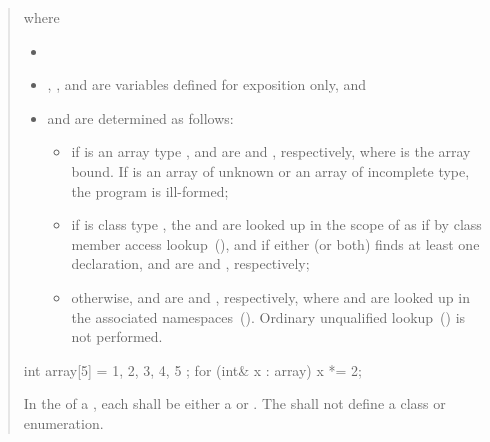 \begin{quote}
where

\begin{itemize}
\item
{}

\item
{}, , and  are variables defined for
exposition only, and 

\item
{} and  are determined as follows:

\begin{itemize}
\item if  is an 
array type ,  and  are
 and , respectively, where  is
the array bound. If  is an array of unknown  or an array of
incomplete type, the program is ill-formed;

\item if  is 
class type , the 
 and  are looked up in the scope of 
as if by class member access lookup~(), and if either
(or both) finds at least one declaration,  and
 are  and ,
respectively;

\item otherwise,  and  are 
and , respectively, where  and  are looked
up in the associated namespaces~().
\enternote Ordinary unqualified lookup~() is not
performed. \exitnote
\end{itemize}
\end{itemize}

\enterexample
\begin{codeblock}
int array[5] = { 1, 2, 3, 4, 5 };
for (int& x : array)
  x *= 2;
\end{codeblock}
\exitexample%

\pnum
In the  of a ,
each  shall be either a 
or . The  shall not define a
class or enumeration.
\end{quote}
